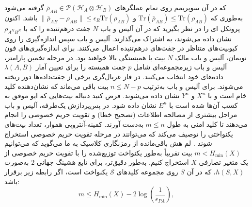 که در آن سوپریمم روی تمام عملگرهای $\bar{\rho}_{AB} \in \mathcal{P}(\mathcal{H}_A \otimes \mathcal{H}_B)$ گرفته می‌شود به‌طوری که $\text{Tr}(\bar{\rho}_{AB}) \leq \text{Tr}(\rho_{AB})$ و $\|\bar{\rho}_{AB} - \rho_{AB}\| \leq \epsilon_R \text{Tr}(\rho_{AB})$ باشد. اکنون پروتکل ای را در نظر بگیرید که در آن آلیس و باب $N$ جفت درهم‌تنیده را که با $\rho_{A^N B^N}$ نشان داده می‌شوند، به اشتراک می‌گذارند. آلیس و باب سپس اندازه‌گیری را روی کیوبیت‌های متناظر در جفت‌های درهم‌تنیده اعمال می‌کنند. برای اندازه‌گیری‌های فون نویمان، آلیس و باب مالک $N$ بیت با همبستگی بالا خواهند بود. در مرحله تخمین پارامتر، آلیس و باب زیرمجموعه‌ای شامل $p$ جفت همبسته را برای تعیین آمار $\lambda(A,B)$ داده‌های خود انتخاب می‌کنند. در فاز غربال‌گری برخی از جفت‌داده‌ها دور ریخته می‌شوند. برای آلیس و باب به‌ترتیب $n \leq N-p$ بیت باقی می‌ماند که نشان‌دهنده کلید خام است و با $X^n$ و $Y^n$ نشان داده می‌شوند. فرض کنید دنباله بیت‌هایی که ایو موفق به کسب آن‌ها شده است با $E^n$ نشان داده شود. در پس‌پردازش یک‌طرفه، آلیس و باب مراحل بیشتری از مصالحه اطلاعات (تصحیح خطا) و تقویت حریم خصوصی را انجام می‌دهند تا کلید امنی به طول $m \leq n$ به‌دست آورند. کمینه-آنتروپی هموار، تعداد بیت‌های یکنواختی را توصیف می‌کند که می‌توانند در مرحله تقویت حریم خصوصی استخراج شوند \cite{8-28, 8-29}. لم هش باقی‌مانده از رمزنگاری کلاسیک \cite{8-35, 8-36} به ما می‌گوید که می‌توانیم $m < H_{\min}(X)$ بیت تقریباً به‌طور یکنواخت توزیع‌شده را با تقویت حریم خصوصی از یک متغیر تصارفی $X$ استخراج کنیم. به‌طور دقیق‌تر، برای تابع هشینگ جهانی-$2$ به‌صورت $h(S, X)$، که در آن $S$ روی مجموعه کلیدهای $\mathcal{S}$ یکنواخت است، اگر رابطه زیر برقرار باشد:
\begin{equation}
	m \leq H_{\min}(X) - 2\log \left( \frac{1}{\epsilon_{PA}} \right),
	\label{eq:8-27}
\end{equation}















